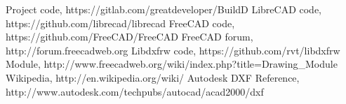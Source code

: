 \begin{thebibliography}{9}
\bibitem{} Project code, https://gitlab.com/greatdeveloper/BuildD
\bibitem{} LibreCAD code, https://github.com/librecad/librecad
\bibitem{} FreeCAD code, https://github.com/FreeCAD/FreeCAD
\bibitem{} FreeCAD forum, http://forum.freecadweb.org
\bibitem{} Libdxfrw code, https://github.com/rvt/libdxfrw
\bibitem{} Module, http://www.freecadweb.org/wiki/index.php?title=Drawing\_Module
\bibitem{} Wikipedia, http://en.wikipedia.org/wiki/
 Autodesk DXF Reference, http://www.autodesk.com/techpubs/autocad/acad2000/dxf
\end{thebibliography}